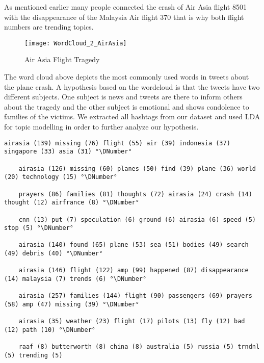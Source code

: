 As mentioned earlier many people connected the crash of Air Asia flight 8501 with the disappearance of the Malaysia Air flight 370 that is why both flight numbers are trending topics. 

\begin{figure}[H]
  \centering
        \texttt{[image: WordCloud\_2\_AirAsia]}
  \caption[Air Asia Flight Tragedy Word Cloud]{Air Asia Flight Tragedy}
  \label{fig:air-asia-flight-tragedy}
  \vspace{-1.3em}
\end{figure}

The word cloud above depicts the most commonly used words in tweets about the plane crash. A hypothesis based on the wordcloud is that the tweets have two different subjects. One subject is news and tweets are there to inform others about the tragedy and the other subject is emotional and shows condolence to families of the victims.
We extracted all hashtags from our dataset and used LDA for topic modelling in order to further analyze our hypothesis.

\begin{lstlisting}[caption={[Topic Model for Air Asia Flight Tragedy] Topic Model for Air Asia Flight Tragedy}, label={lst:topic-model-air-asia}, float=h]
	airasia (139) missing (76) flight (55) air (39) indonesia (37) singapore (33) asia (31) °\DNumber°

	airasia (126) missing (60) planes (50) find (39) plane (36) world (20) technology (15) °\DNumber°

	prayers (86) families (81) thoughts (72) airasia (24) crash (14) thought (12) airfrance (8) °\DNumber°

	cnn (13) put (7) speculation (6) ground (6) airasia (6) speed (5) stop (5) °\DNumber°

	airasia (140) found (65) plane (53) sea (51) bodies (49) search (49) debris (40) °\DNumber°

	airasia (146) flight (122) amp (99) happened (87) disappearance (14) malaysia (7) trends (6) °\DNumber°

	airasia (257) families (144) flight (90) passengers (69) prayers (58) amp (47) missing (39) °\DNumber°

	airasia (35) weather (23) flight (17) pilots (13) fly (12) bad (12) path (10) °\DNumber°

	raaf (8) butterworth (8) china (8) australia (5) russia (5) trndnl (5) trending (5)
\end{lstlisting}


